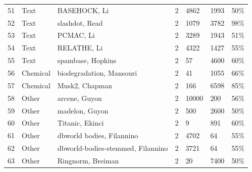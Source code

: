 \documentclass[preprint,12pt,authoryear]{elsarticle}
\begin{document}
{{\begin{longtable}{|c|p{1.9cm}|p{6.7cm}|c|p{0.75cm}|p{0.75cm}|p{0.75cm}|}
51 & Text       & BASEHOCK, Li \citeyearpar{li2017feature}                      & 2 & 4862  & 1993  & 50\% \\
52 & Text       & slashdot, Read \citeyearpar{read2011classifier}                 & 2 & 1079  & 3782  & 98\% \\
53 & Text       & PCMAC, Li \citeyearpar{li2017feature}                         & 2 & 3289  & 1943  & 51\% \\
54 & Text       & RELATHE, Li \citeyearpar{li2017feature}                       & 2 & 4322  & 1427  & 55\% \\
55 & Text       & spambase, Hopkins \citeyearpar{spambase_94}                        & 2 & 57    & 4600  & 60\% \\ \hline
56 & Chemical   & biodegradation, Mansouri \citeyearpar{mansouri2013quantitative}     & 2 & 41    & 1055  & 66\% \\
57 & Chemical   & Musk2, Chapman \citeyearpar{musk_(version_2)_75}                  & 2 & 166   & 6598  & 85\% \\ \hline
58 & Other      & arcene, Guyon \citeyearpar{guyon2004result}                      & 2 & 10000 & 200   & 56\% \\
59 & Other      & madelon, Guyon \citeyearpar{guyon2004result}                     & 2 & 500   & 2600  & 50\% \\
60 & Other      & Titanic, Ekinci \citeyearpar{ekinci2018comparative}               & 2 & 9     & 891   & 60\% \\
61 & Other      & dbworld bodies, Filannino \citeyearpar{dbworld_e-mails_219}          & 2 & 4702  & 64    & 55\% \\
62 & Other      & dbworld-bodies-stemmed, Filannino \citeyearpar{filannino2011dbworld} & 2 & 3721  & 64    & 55\% \\
63 & Other      & Ringnorm, Breiman \citeyearpar{breiman1996bias}                    & 2 & 20    & 7400  & 50\% \\ \hline


\end{longtable}}}
\end{document}
